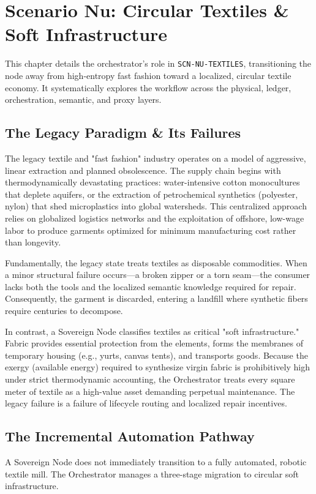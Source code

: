 \chapter{Scenario Nu: Circular Textiles \& Soft Infrastructure}
\label{ch:scenario_nu}

This chapter details the orchestrator's role in \texttt{SCN-NU-TEXTILES}, transitioning the node away from high-entropy fast fashion toward a localized, circular textile economy. It systematically explores the workflow across the physical, ledger, orchestration, semantic, and proxy layers.

\section{The Legacy Paradigm \& Its Failures}
The legacy textile and "fast fashion" industry operates on a model of aggressive, linear extraction and planned obsolescence. The supply chain begins with thermodynamically devastating practices: water-intensive cotton monocultures that deplete aquifers, or the extraction of petrochemical synthetics (polyester, nylon) that shed microplastics into global watersheds. This centralized approach relies on globalized logistics networks and the exploitation of offshore, low-wage labor to produce garments optimized for minimum manufacturing cost rather than longevity.

Fundamentally, the legacy state treats textiles as disposable commodities. When a minor structural failure occurs---a broken zipper or a torn seam---the consumer lacks both the tools and the localized semantic knowledge required for repair. Consequently, the garment is discarded, entering a landfill where synthetic fibers require centuries to decompose. 

In contrast, a Sovereign Node classifies textiles as critical "soft infrastructure." Fabric provides essential protection from the elements, forms the membranes of temporary housing (e.g., yurts, canvas tents), and transports goods. Because the exergy (available energy) required to synthesize virgin fabric is prohibitively high under strict thermodynamic accounting, the Orchestrator treats every square meter of textile as a high-value asset demanding perpetual maintenance. The legacy failure is a failure of lifecycle routing and localized repair incentives.

\section{The Incremental Automation Pathway}
A Sovereign Node does not immediately transition to a fully automated, robotic textile mill. The Orchestrator manages a three-stage migration to circular soft infrastructure.


